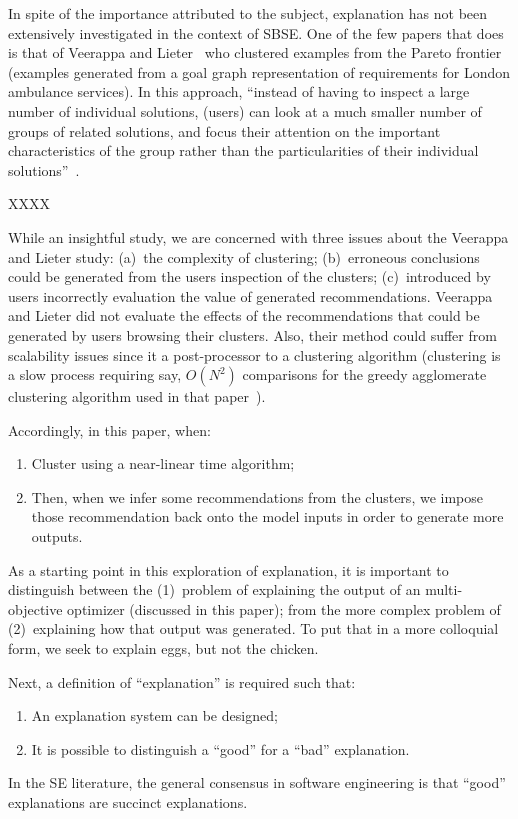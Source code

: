\documentclass[runningheads]{llncs}
\newcommand{\be}{\begin{enumerate}}
\newcommand{\ee}{\end{enumerate}}
\begin{document}
In spite of the importance attributed to the subject,
explanation has not been extensively investigated in the context of SBSE.
One of the few papers that does is that of 
 Veerappa and Lieter~\cite{veerappa11} who
clustered examples from the Pareto
frontier (examples generated from a goal graph representation of requirements
for London ambulance services). In this approach,
``instead of having to inspect a large
number of individual solutions, (users) can look at a
much smaller number of groups of related solutions,
and focus their attention on the important
characteristics of the group rather than the
particularities of their individual solutions''~\cite{veerappa11}. 

XXXX

While an insightful study, we are concerned with
three issues about the Veerappa and Lieter study: (a)~the complexity
of clustering; (b)~erroneous conclusions could be generated from the users 
inspection of the clusters; (c)~introduced by users
incorrectly evaluation the value of generated recommendations.
 Veerappa and Lieter did not evaluate the effects
of the recommendations that could be generated by users browsing their
clusters. 
Also, their method could suffer from scalability issues since it
a post-processor
to a clustering algorithm (clustering is a slow process  requiring
 say, $O(N^2)$ comparisons
for the greedy agglomerate clustering algorithm used in that paper~\cite{koc11b}).

Accordingly, in this paper, when:
\be
\item Cluster using a near-linear time algorithm;
\item Then, when we infer some recommendations from the clusters,
we impose those recommendation back onto the model inputs in order to generate
more outputs. 
\ee
As a starting point in this exploration of explanation,
it is important to distinguish between the
(1)~problem of explaining the output of an
multi-objective optimizer (discussed in this paper);
from the more complex problem of (2)~explaining how
that output was generated.  To put that in a more
colloquial form, we seek to explain eggs, but not
the chicken.

Next, a definition of  ``explanation'' is required such that:
\be
\item An explanation system can be designed;
\item It is possible to distinguish a  ``good'' for a ``bad'' explanation.
\ee
In the SE literature,
the general consensus in
software engineering is that ``good'' explanations
are succinct explanations.  
\end{document}
